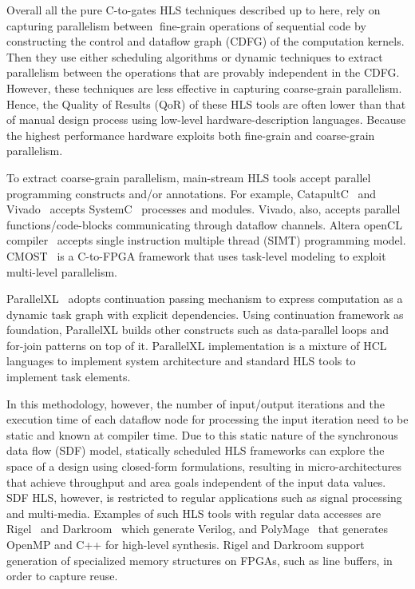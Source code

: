 Overall all the pure C-to-gates HLS techniques described up to here, rely on capturing parallelism between fine-grain operations of sequential code by constructing the control and dataflow graph (CDFG) of the computation kernels.
Then they use either scheduling algorithms or dynamic techniques to extract parallelism between the operations that are provably independent in the CDFG.
However, these techniques are less effective in capturing coarse-grain parallelism.
Hence, the Quality of Results (QoR) of these HLS tools are often lower than that of manual design process using low-level hardware-description languages.
Because the highest performance hardware exploits both fine-grain and coarse-grain parallelism.

To extract coarse-grain parallelism, main-stream HLS tools accept parallel programming constructs and/or annotations.
For example, CatapultC~\cite{catapult} and Vivado~\cite{vivado} accepts SystemC~\cite{systemc} processes and modules.
Vivado, also, accepts parallel functions/code-blocks communicating through dataflow channels.
Altera openCL compiler~\cite{opencl_sdk} accepts single instruction multiple thread (SIMT) programming model. 
CMOST~\cite{zhang_DAC_2015_cmost} is a C-to-FPGA framework that uses task-level modeling to exploit multi-level parallelism.

ParallelXL~\cite{chen_micro_2018_parallelXL} adopts continuation passing mechanism to express computation as a dynamic task graph with explicit dependencies.
Using continuation framework as foundation, ParallelXL builds other constructs such as data-parallel loops and for-join patterns on top of it.
ParallelXL implementation is a mixture of HCL languages to implement system architecture and standard HLS tools to implement task elements.

In this methodology, however, the number of input/output iterations and the execution time of each dataflow node for processing the input iteration need to be static and known at compiler time.
Due to this static nature of the synchronous data flow (SDF) model, statically scheduled HLS frameworks can explore the space of a design using closed-form formulations, resulting in micro-architectures that achieve throughput and area goals independent of the input data values.
SDF HLS, however, is restricted to regular applications such as signal processing and multi-media.
Examples of such HLS tools with regular data accesses are Rigel~\cite{hegarty_2016_rigel} and Darkroom~\cite{darkroom} which generate Verilog, and PolyMage~\cite{mullapudi_asplos_2015_polymage} that generates OpenMP and C++ for high-level synthesis.
Rigel and Darkroom support generation of specialized memory structures on FPGAs, such as line buffers, in order to capture reuse.

